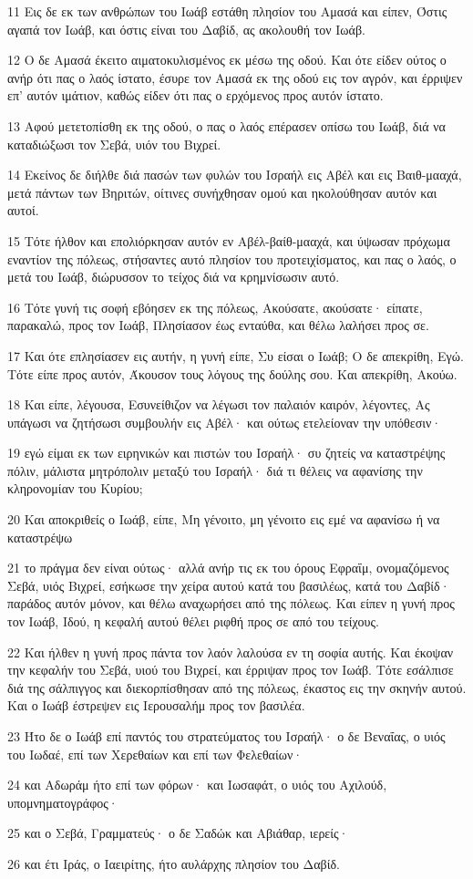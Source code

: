 \par 11 Εις δε εκ των ανθρώπων του Ιωάβ εστάθη πλησίον του Αμασά και είπεν, Όστις αγαπά τον Ιωάβ, και όστις είναι του Δαβίδ, ας ακολουθή τον Ιωάβ.
\par 12 Ο δε Αμασά έκειτο αιματοκυλισμένος εκ μέσω της οδού. Και ότε είδεν ούτος ο ανήρ ότι πας ο λαός ίστατο, έσυρε τον Αμασά εκ της οδού εις τον αγρόν, και έρριψεν επ' αυτόν ιμάτιον, καθώς είδεν ότι πας ο ερχόμενος προς αυτόν ίστατο.
\par 13 Αφού μετετοπίσθη εκ της οδού, ο πας ο λαός επέρασεν οπίσω του Ιωάβ, διά να καταδιώξωσι τον Σεβά, υιόν του Βιχρεί.
\par 14 Εκείνος δε διήλθε διά πασών των φυλών του Ισραήλ εις Αβέλ και εις Βαιθ-μααχά, μετά πάντων των Βηριτών, οίτινες συνήχθησαν ομού και ηκολούθησαν αυτόν και αυτοί.
\par 15 Τότε ήλθον και επολιόρκησαν αυτόν εν Αβέλ-βαίθ-μααχά, και ύψωσαν πρόχωμα εναντίον της πόλεως, στήσαντες αυτό πλησίον του προτειχίσματος, και πας ο λαός, ο μετά του Ιωάβ, διώρυσσον το τείχος διά να κρημνίσωσιν αυτό.
\par 16 Τότε γυνή τις σοφή εβόησεν εκ της πόλεως, Ακούσατε, ακούσατε· είπατε, παρακαλώ, προς τον Ιωάβ, Πλησίασον έως ενταύθα, και θέλω λαλήσει προς σε.
\par 17 Και ότε επλησίασεν εις αυτήν, η γυνή είπε, Συ είσαι ο Ιωάβ; Ο δε απεκρίθη, Εγώ. Τότε είπε προς αυτόν, Άκουσον τους λόγους της δούλης σου. Και απεκρίθη, Ακούω.
\par 18 Και είπε, λέγουσα, Εσυνείθιζον να λέγωσι τον παλαιόν καιρόν, λέγοντες, Ας υπάγωσι να ζητήσωσι συμβουλήν εις Αβέλ· και ούτως ετελείοναν την υπόθεσιν·
\par 19 εγώ είμαι εκ των ειρηνικών και πιστών του Ισραήλ· συ ζητείς να καταστρέψης πόλιν, μάλιστα μητρόπολιν μεταξύ του Ισραήλ· διά τι θέλεις να αφανίσης την κληρονομίαν του Κυρίου;
\par 20 Και αποκριθείς ο Ιωάβ, είπε, Μη γένοιτο, μη γένοιτο εις εμέ να αφανίσω ή να καταστρέψω
\par 21 το πράγμα δεν είναι ούτως· αλλά ανήρ τις εκ του όρους Εφραΐμ, ονομαζόμενος Σεβά, υιός Βιχρεί, εσήκωσε την χείρα αυτού κατά του βασιλέως, κατά του Δαβίδ· παράδος αυτόν μόνον, και θέλω αναχωρήσει από της πόλεως. Και είπεν η γυνή προς τον Ιωάβ, Ιδού, η κεφαλή αυτού θέλει ριφθή προς σε από του τείχους.
\par 22 Και ήλθεν η γυνή προς πάντα τον λαόν λαλούσα εν τη σοφία αυτής. Και έκοψαν την κεφαλήν του Σεβά, υιού του Βιχρεί, και έρριψαν προς τον Ιωάβ. Τότε εσάλπισε διά της σάλπιγγος και διεκορπίσθησαν από της πόλεως, έκαστος εις την σκηνήν αυτού. Και ο Ιωάβ έστρεψεν εις Ιερουσαλήμ προς τον βασιλέα.
\par 23 Ήτο δε ο Ιωάβ επί παντός του στρατεύματος του Ισραήλ· ο δε Βεναΐας, ο υιός του Ιωδαέ, επί των Χερεθαίων και επί των Φελεθαίων·
\par 24 και Αδωράμ ήτο επί των φόρων· και Ιωσαφάτ, ο υιός του Αχιλούδ, υπομνηματογράφος·
\par 25 και ο Σεβά, Γραμματεύς· ο δε Σαδώκ και Αβιάθαρ, ιερείς·
\par 26 και έτι Ιράς, ο Ιαειρίτης, ήτο αυλάρχης πλησίον του Δαβίδ.

